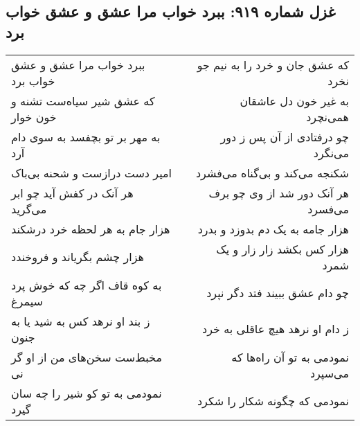\begin{center}
\section*{غزل شماره ۹۱۹: ببرد خواب مرا عشق و عشق خواب برد}
\label{sec:0919}
\begin{longtable}{l p{0.5cm} r}
ببرد خواب مرا عشق و عشق خواب برد
&&
که عشق جان و خرد را به نیم جو نخرد
\\
که عشق شیر سیاه‌ست تشنه و خون خوار
&&
به غیر خون دل عاشقان همی‌نچرد
\\
به مهر بر تو بچفسد به سوی دام آرد
&&
چو درفتادی از آن پس ز دور می‌نگرد
\\
امیر دست درازست و شحنه بی‌باک
&&
شکنجه می‌کند و بی‌گناه می‌فشرد
\\
هر آنک در کفش آید چو ابر می‌گرید
&&
هر آنک دور شد از وی چو برف می‌فسرد
\\
هزار جام به هر لحظه خرد درشکند
&&
هزار جامه به یک دم بدوزد و بدرد
\\
هزار چشم بگریاند و فروخندد
&&
هزار کس بکشد زار زار و یک شمرد
\\
به کوه قاف اگر چه که خوش پرد سیمرغ
&&
چو دام عشق ببیند فتد دگر نپرد
\\
ز بند او نرهد کس به شید یا به جنون
&&
ز دام او نرهد هیچ عاقلی به خرد
\\
مخبط‌ست سخن‌های من از او گر نی
&&
نمودمی به تو آن راه‌ها که می‌سپرد
\\
نمودمی به تو کو شیر را چه سان گیرد
&&
نمودمی که چگونه شکار را شکرد
\\
\end{longtable}
\end{center}
